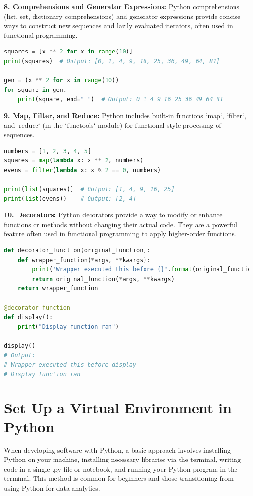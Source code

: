 \documentclass[12pt]{article}
\begin{document}
\vspace{0.5cm}

\textbf{8. Comprehensions and Generator Expressions:} Python comprehensions (list, set, dictionary comprehensions) and generator expressions provide concise ways to construct new sequences and lazily evaluated iterators, often used in functional programming.
\begin{lstlisting}[language = Python]
squares = [x ** 2 for x in range(10)]
print(squares)  # Output: [0, 1, 4, 9, 16, 25, 36, 49, 64, 81]

gen = (x ** 2 for x in range(10))
for square in gen:
    print(square, end=" ")  # Output: 0 1 4 9 16 25 36 49 64 81
\end{lstlisting}

\vspace{0.5cm}

\textbf{9. Map, Filter, and Reduce:} Python includes built-in functions `map`, `filter`, and `reduce` (in the `functools` module) for functional-style processing of sequences.
\begin{lstlisting}[language = Python]
numbers = [1, 2, 3, 4, 5]
squares = map(lambda x: x ** 2, numbers)
evens = filter(lambda x: x % 2 == 0, numbers)

print(list(squares))  # Output: [1, 4, 9, 16, 25]
print(list(evens))    # Output: [2, 4]
\end{lstlisting}

\vspace{0.5cm}

\textbf{10. Decorators:} Python decorators provide a way to modify or enhance functions or methods without changing their actual code. They are a powerful feature often used in functional programming to apply higher-order functions.
\begin{lstlisting}[language = Python]
def decorator_function(original_function):
    def wrapper_function(*args, **kwargs):
        print("Wrapper executed this before {}".format(original_function.__name__))
        return original_function(*args, **kwargs)
    return wrapper_function

@decorator_function
def display():
    print("Display function ran")

display()
# Output:
# Wrapper executed this before display
# Display function ran
\end{lstlisting}

\vspace{0.5cm}

\section{Set Up a Virtual Environment in Python}
When developing software with Python, a basic approach involves installing Python on your machine, installing necessary libraries via the terminal, writing code in a single .py file or notebook, and running your Python program in the terminal. This method is common for beginners and those transitioning from using Python for data analytics.\\
\end{document}
